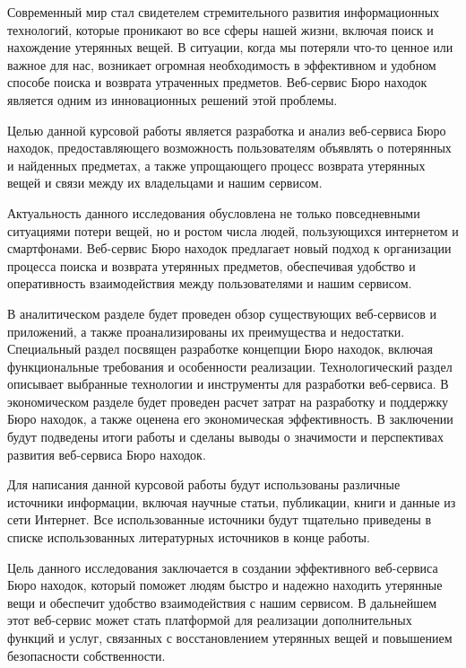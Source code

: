 \documentclass{mirea}
\begin{document}
	
% 
	
\addtocounter{page}{2}

\tableofcontents



Современный мир стал свидетелем стремительного развития информационных технологий, которые проникают во все сферы нашей жизни, включая поиск и нахождение утерянных вещей. В ситуации, когда мы потеряли что-то ценное или важное для нас, возникает огромная необходимость в эффективном и удобном способе поиска и возврата утраченных предметов. Веб-сервис Бюро находок является одним из инновационных решений этой проблемы.

Целью данной курсовой работы является разработка и анализ веб-сер\-ви\-са Бюро находок, предоставляющего возможность пользователям объявлять о потерянных и найденных предметах, а также упрощающего процесс возврата утерянных вещей и связи между их владельцами и нашим сервисом.

Актуальность данного исследования обусловлена не только повседневными ситуациями потери вещей, но и ростом числа людей, пользующихся интернетом и смартфонами. Веб-сервис Бюро находок предлагает новый подход к организации процесса поиска и возврата утерянных предметов, обеспечивая удобство и оперативность взаимодействия между пользователями и нашим сервисом.

В аналитическом разделе будет проведен обзор существующих веб-сер\-ви\-сов и приложений, а также проанализированы их преимущества и недостатки. Специальный раздел посвящен разработке концепции Бюро находок, включая функциональные требования и особенности реализации. Технологический раздел описывает выбранные технологии и инструменты для разработки веб-сервиса. В экономическом разделе будет проведен расчет затрат на разработку и поддержку Бюро находок, а также оценена его экономическая эффективность. В заключении будут подведены итоги работы и сделаны выводы о значимости и перспективах развития веб-сервиса Бюро находок.

Для написания данной курсовой работы будут использованы различные источники информации, включая научные статьи, публикации, книги и данные из сети Интернет. Все использованные источники будут тщательно приведены в списке использованных литературных источников в конце работы.

Цель данного исследования заключается в создании эффективного веб-сервиса Бюро находок, который поможет людям быстро и надежно находить утерянные вещи и обеспечит удобство взаимодействия с нашим сервисом. В дальнейшем этот веб-сервис может стать платформой для реализации дополнительных функций и услуг, связанных с восстановлением утерянных вещей и повышением безопасности собственности.
\end{document}
